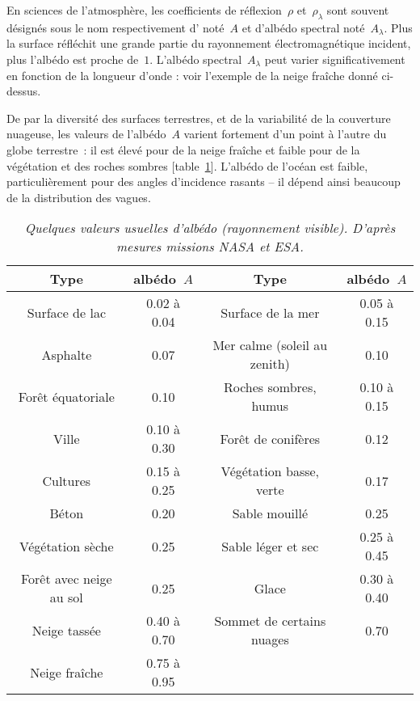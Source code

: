 \sk
En sciences de l'atmosphère, les coefficients de réflexion~$\rho$ et~$\rho_{\lambda}$ sont souvent désignés sous le nom respectivement d' noté~$A$ et d'albédo spectral noté~$A_{\lambda}$. Plus la surface réfléchit une grande partie du rayonnement électromagnétique incident, plus l'albédo est proche de~$1$. L'albédo spectral~$A_{\lambda}$ peut varier significativement en fonction de la longueur d'onde : voir l'exemple de la neige fraîche donné ci-dessus. 

\sk
De par la diversité des surfaces terrestres, et de la variabilité de la couverture nuageuse, les valeurs de l'albédo~$A$ varient fortement d'un point à l'autre du globe terrestre~: il est élevé pour de la neige fraîche et faible pour de la végétation et des roches sombres [table~\ref{tab:albedo}]. L'albédo de l'océan est faible, particulièrement pour des angles d'incidence rasants -- il dépend ainsi beaucoup de la distribution des vagues. 

\begin{table}\label{tab:albedo}
\begin{center}
\begin{tabular}{|c|c|c|c|}
\hline
Type & albédo~$A$ & Type & albédo~$A$ \\
\hline
Surface de lac & 0.02 à 0.04 & Surface de la mer & 0.05 à 0.15 \\
Asphalte & 0.07 & Mer calme (soleil au zenith) & 0.10 \\
Forêt équatoriale & 0.10 & Roches sombres, humus & 0.10 à 0.15 \\
Ville & 0.10 à 0.30 & Forêt de conifères & 0.12 \\
Cultures & 0.15 à 0.25 & Végétation basse, verte & 0.17 \\
Béton & 0.20 & Sable mouillé & 0.25 \\
Végétation sèche & 0.25 & Sable léger et sec & 0.25 à 0.45 \\
Forêt avec neige au sol & 0.25 & Glace & 0.30 à 0.40 \\
Neige tassée & 0.40 à 0.70 & Sommet de certains nuages & 0.70 \\
Neige fraîche & 0.75 à 0.95 & & \\
\hline
\end{tabular}
\caption{\emph{Quelques valeurs usuelles d'albédo (rayonnement visible). D'après mesures missions NASA et ESA.}}
\end{center}
\end{table}

